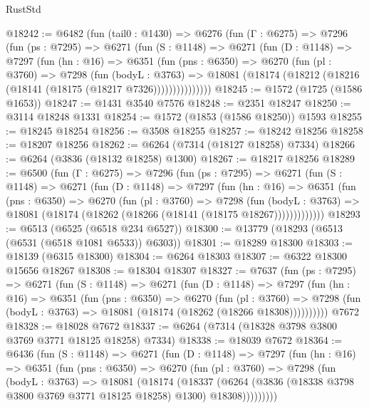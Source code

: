 \begin{lexlean}{RustStd}
\begin{coremodule}
@18242 := @6482
    (fun (tail0 : @1430) =>
    @6276
      (fun (Γ : @6275) =>
      @7296
        (fun (ps : @7295) =>
        @6271
          (fun (S : @1148) =>
          @6271
            (fun (D : @1148) =>
            @7297
              (fun (hn : @16) =>
              @6351
                (fun (pns : @6350) =>
                @6270
                  (fun (pl : @3760) =>
                  @7298
                    (fun (bodyL : @3763) =>
                    @18081 (@18174 (@18212 (@18216 (@18141 (@18175 (@18217 @7326)))))))))))))))
@18245 := @1572 (@1725 (@1586 @1653))
@18247 := @1431 @3540 @7576
@18248 := @2351 @18247
@18250 := @3114 @18248 @1331
@18254 := @1572 (@1853 (@1586 @18250)) @1593
@18255 := @18245 @18254
@18256 := @3508 @18255
@18257 := @18242 @18256
@18258 := @18207 @18256
@18262 := @6264 (@7314 (@18127 @18258) @7334)
@18266 := @6264 (@3836 (@18132 @18258) @1300)
@18267 := @18217 @18256
@18289 := @6500
    (fun (Γ : @6275) =>
    @7296
      (fun (ps : @7295) =>
      @6271
        (fun (S : @1148) =>
        @6271
          (fun (D : @1148) =>
          @7297
            (fun (hn : @16) =>
            @6351
              (fun (pns : @6350) =>
              @6270
                (fun (pl : @3760) =>
                @7298
                  (fun (bodyL : @3763) =>
                  @18081 (@18174 (@18262 (@18266 (@18141 (@18175 @18267)))))))))))))
@18293 := @6513 (@6525 (@6518 @234 @6527))
@18300 := @13779 (@18293 (@6513 (@6531 (@6518 @1081 @6533)) @6303))
@18301 := @18289 @18300
@18303 := @18139 (@6315 @18300)
@18304 := @6264 @18303
@18307 := @6322 @18300 @15656 @18267
@18308 := @18304 @18307
@18327 := @7637
    (fun (ps : @7295) =>
    @6271
      (fun (S : @1148) =>
      @6271
        (fun (D : @1148) =>
        @7297
          (fun (hn : @16) =>
          @6351
            (fun (pns : @6350) =>
            @6270
              (fun (pl : @3760) =>
              @7298 (fun (bodyL : @3763) => @18081 (@18174 (@18262 (@18266 @18308))))))))))
    @7672
@18328 := @18028 @7672
@18337 := @6264 (@7314 (@18328 @3798 @3800 @3769 @3771 @18125 @18258) @7334)
@18338 := @18039 @7672
@18364 := @6436
    (fun (S : @1148) =>
    @6271
      (fun (D : @1148) =>
      @7297
        (fun (hn : @16) =>
        @6351
          (fun (pns : @6350) =>
          @6270
            (fun (pl : @3760) =>
            @7298
              (fun (bodyL : @3763) =>
              @18081
                (@18174
                  (@18337
                    (@6264
                      (@3836 (@18338 @3798 @3800 @3769 @3771 @18125 @18258) @1300)
                      @18308)))))))))

\end{coremodule}
\end{lexlean}
